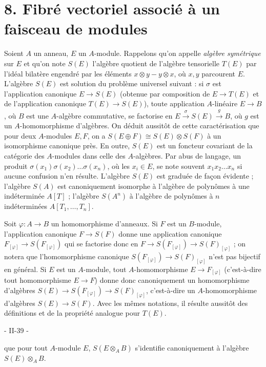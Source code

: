 \section*{8. Fibré vectoriel associé à un faisceau de modules}

Soient $A$ un anneau, $E$ un $A$-module. Rappelons qu'on appelle \emph{algèbre symétrique} sur $E$ et qu'on note $S(E)$ l'algèbre quotient de l'algèbre tensorielle $T(E)$ par l'idéal bilatère engendré par les éléments $x \otimes y - y \otimes x$, où $x, y$ parcourent $E$. L'algèbre $S(E)$ est solution du problème universel suivant : si $\sigma$ est l'application canonique $E \to S(E)$ (obtenue par composition de $E \to T(E)$ et de l'application canonique $T(E) \to S(E)$), toute application $A$-linéaire $E \to B$, où $B$ est une $A$-algèbre commutative, se factorise en $E \xrightarrow{\sigma} S(E) \xrightarrow{g} B$, où $g$ est un $A$-homomorphisme d'algèbres. On déduit aussitôt de cette caractérisation que pour deux $A$-modules $E, F$, on a $S(E \oplus F) \cong S(E) \otimes S(F)$ à un isomorphisme canonique près. En outre, $S(E)$ est un foncteur covariant de la catégorie des $A$-modules dans celle des $A$-algèbres. Par abus de langage, un produit $\sigma(x_1)\sigma(x_2) \dots \sigma(x_n)$, où les $x_i \in E$, se note souvent $x_1 x_2 \dots x_n$ si aucune confusion n'en résulte. L'algèbre $S(E)$ est graduée de façon évidente ; l'algèbre $S(A)$ est canoniquement isomorphe à l'algèbre de polynômes à une indéterminée $A[T]$ ; l'algèbre $S(A^n)$ à l'algèbre de polynômes à $n$ indéterminées $A[T_1, \dots, T_n]$.

Soit $\varphi: A \to B$ un homomorphisme d'anneaux. Si $F$ est un $B$-module, l'application canonique $F \to S(F)$ donne une application canonique $F_{[\varphi]} \to S(F_{[\varphi]})$ qui se factorise donc en $F \to S(F_{[\varphi]}) \to S(F)_{[\varphi]}$ ; on notera que l'homomorphisme canonique $S(F_{[\varphi]}) \to S(F)_{[\varphi]}$ n'est pas bijectif en général. Si $E$ est un $A$-module, tout $A$-homomorphisme $E \to F_{[\varphi]}$ (c'est-à-dire tout homomorphisme $E \to F$) donne donc canoniquement un homomorphisme d'algèbres $S(E) \to S(F_{[\varphi]}) \to S(F)_{[\varphi]}$, c'est-à-dire un $A$-homomorphisme d'algèbres $S(E) \to S(F)$. Avec les mêmes notations, il résulte aussitôt des définitions et de la propriété analogue pour $T(E)$.

\newpage


- II-39 -

que pour tout $A$-module $E$, $S(E \otimes_A B)$ s'identifie canoniquement à l'algèbre $S(E) \otimes_A B$.

